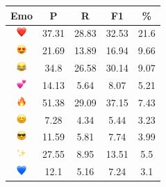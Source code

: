 \documentclass{article}
\begin{document}
\begin{table}
\centering
\begin{tabular}{|c|ccc|c|} \hline
\textbf{Emo} & \textbf{P} & \textbf{R} & \textbf{F1} & \textbf{\%} \\ \hline
\includegraphics[height=0.37cm,width=0.37cm]{img/red_heart.png} & 37.31 & 28.83 & 32.53 & 21.6\\ 
\includegraphics[height=0.37cm,width=0.37cm]{img/smiling_face_with_hearteyes.png} & 21.69 & 13.89 & 16.94 & 9.66\\ 
\includegraphics[height=0.37cm,width=0.37cm]{img/face_with_tears_of_joy.png} & 34.8 & 26.58 & 30.14 & 9.07\\ 
\includegraphics[height=0.37cm,width=0.37cm]{img/two_hearts.png} & 14.13 & 5.64 & 8.07 & 5.21\\ 
\includegraphics[height=0.37cm,width=0.37cm]{img/fire.png} & 51.38 & 29.09 & 37.15 & 7.43\\ 
\includegraphics[height=0.37cm,width=0.37cm]{img/smiling_face_with_smiling_eyes.png} & 7.28 & 4.34 & 5.44 & 3.23\\ 
\includegraphics[height=0.37cm,width=0.37cm]{img/smiling_face_with_sunglasses.png} & 11.59 & 5.81 & 7.74 & 3.99\\ 
\includegraphics[height=0.37cm,width=0.37cm]{img/sparkles.png} & 27.55 & 8.95 & 13.51 & 5.5\\ 
\includegraphics[height=0.37cm,width=0.37cm]{img/blue_heart.png} & 12.1 & 5.16 & 7.24 & 3.1\\ 

\end{tabular}
\end{table}
\end{document}

